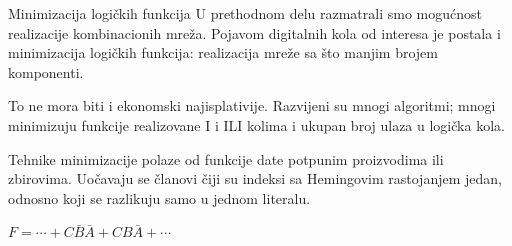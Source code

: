 \begin{frame}[label=02-s032]{Minimizacija logičkih funkcija}
U prethodnom delu razmatrali smo mogućnost realizacije kombinacionih mreža. Pojavom digitalnih kola od interesa je postala i \alert{minimizacija logičkih funkcija}: realizacija mreže sa što manjim brojem komponenti.
\par\vspace{3mm}
To ne mora biti i ekonomski najisplativije. Razvijeni su mnogi algoritmi; mnogi minimizuju funkcije realizovane I i ILI kolima i ukupan broj ulaza u logička kola.
\par\vspace{3mm}
Tehnike minimizacije polaze od funkcije date potpunim proizvodima ili zbirovima. Uočavaju se članovi čiji su \alert{indeksi sa Hemingovim rastojanjem jedan}, odnosno koji se razlikuju samo u jednom literalu.
\par\vspace{3mm}
\vspace{2mm}
{\centering \(F=\cdots+C\bar B\bar A+CB\bar A+\cdots\)\par}
\end{frame}
